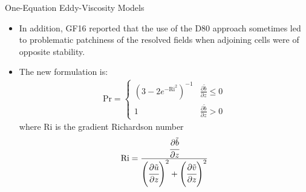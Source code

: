 
\begin{frame}{One-Equation Eddy-Viscosity Models}
\begin{itemize}
	\item In addition, GF16 reported that the use of the D80 approach sometimes led to problematic patchiness of the resolved fields when adjoining cells were of opposite stability.
	\item The new formulation is:
	\begin{gather*}
\text{Pr} = 
\begin{cases}
\left(3 - 2e^{-\mathrm{Ri}^2}\right)^{-1} & \frac{\partial \tilde{b}}{\partial z} \leq 0\\
1  & \frac{\partial \tilde{b}}{\partial z} > 0
\end{cases}
\label{prnew}
\end{gather*}
where $\mathrm{Ri}$ is the gradient Richardson number
$$\mathrm{Ri} = \frac{\cfrac{\partial \tilde{b}}{\partial z}}{ \Bigg(\cfrac{\partial \tilde{u}}{\partial z}\Bigg)^2 +\Bigg(\cfrac{\partial \tilde{v}}{\partial z}\Bigg)^2}$$
\end{itemize}

\end{frame}


